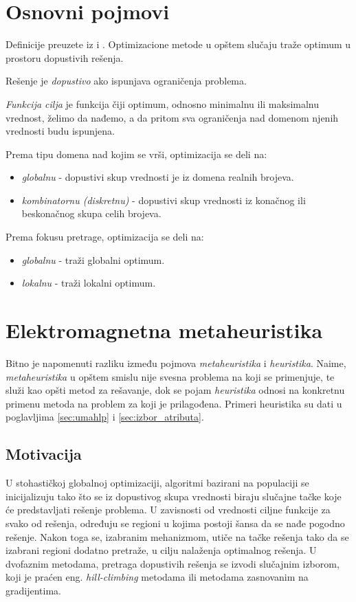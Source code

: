 \documentclass[a4paper]{article}
\begin{document}
\section{Osnovni pojmovi}
\label{sec:osnovni_pojmovi}
Definicije preuzete iz \cite{computational-intelligence} i \cite{optimizacija}.
Optimizacione metode u opštem slučaju traže optimum u prostoru dopustivih rešenja.

Rešenje je \textit{dopustivo} ako ispunjava ograničenja problema.

\textit{Funkcija cilja} je funkcija čiji optimum, odnosno minimalnu ili maksimalnu vrednost, želimo da nađemo, a da pritom sva ograničenja nad domenom njenih vrednosti budu ispunjena.

Prema tipu domena nad kojim se vrši, optimizacija se deli na:
\begin{itemize}
    \item \textit{globalnu} - dopustivi skup vrednosti je iz domena realnih brojeva.
    \item \textit{kombinatornu (diskretnu)} - dopustivi skup vrednosti iz konačnog ili beskonačnog skupa celih brojeva.
\end{itemize}

Prema fokusu pretrage, optimizacija se deli na:
\begin{itemize}
    \item \textit{globalnu} - traži globalni optimum.
    \item \textit{lokalnu} - traži lokalni optimum.
\end{itemize}
\section{Elektromagnetna metaheuristika}
\label{sec:metaheuristika}

Bitno je napomenuti razliku između pojmova \textit{metaheuristika} i \textit{heuristika}. Naime, \textit{metaheuristika} u opštem smislu nije svesna problema na koji se primenjuje, te služi kao opšti metod za rešavanje, dok se pojam \textit{heuristika} odnosi na konkretnu primenu metoda na problem za koji je prilagođena. Primeri heuristika su dati u poglavljima \ref{sec:umahlp} i \ref{sec:izbor_atributa}.

\subsection{Motivacija}
\label{subsec:motivacija}
U stohastičkoj globalnoj optimizaciji, algoritmi bazirani na populaciji se inicijalizuju tako što se iz dopustivog skupa vrednosti biraju slučajne tačke koje će predstavljati rešenje problema. U zavisnosti od vrednosti ciljne funkcije za svako od rešenja, određuju se regioni u kojima postoji šansa da se nađe pogodno rešenje. Nakon toga se, izabranim mehanizmom, utiče na tačke rešenja tako da se izabrani regioni dodatno pretraže, u cilju nalaženja optimalnog rešenja. U dvofaznim metodama, pretraga dopustivih rešenja se izvodi slučajnim izborom, koji je praćen eng. \textit{hill-climbing} metodama ili metodama zasnovanim na gradijentima\cite{kan-timer}. 
\end{document}
